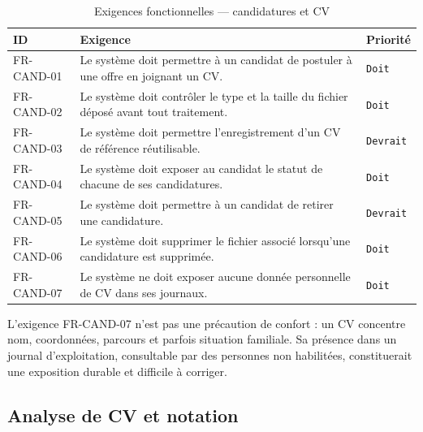\begin{table}[htbp]
  \centering
  \caption{Exigences fonctionnelles — candidatures et CV}
  \label{tab:fr_applications}
  \begin{tabularx}{\textwidth}{L{2.4cm} X L{1.9cm}}
    \toprule
    \textbf{ID} & \textbf{Exigence} & \textbf{Priorité} \\
    \midrule
    FR-CAND-01 & Le système doit permettre à un candidat de postuler à une offre en joignant un CV. & \texttt{Doit} \\
    FR-CAND-02 & Le système doit contrôler le type et la taille du fichier déposé avant tout traitement. & \texttt{Doit} \\
    FR-CAND-03 & Le système doit permettre l'enregistrement d'un CV de référence réutilisable. & \texttt{Devrait} \\
    FR-CAND-04 & Le système doit exposer au candidat le statut de chacune de ses candidatures. & \texttt{Doit} \\
    FR-CAND-05 & Le système doit permettre à un candidat de retirer une candidature. & \texttt{Devrait} \\
    FR-CAND-06 & Le système doit supprimer le fichier associé lorsqu'une candidature est supprimée. & \texttt{Doit} \\
    FR-CAND-07 & Le système ne doit exposer aucune donnée personnelle de CV dans ses journaux. & \texttt{Doit} \\
    \bottomrule
  \end{tabularx}
\end{table}

L'exigence FR-CAND-07 n'est pas une précaution de confort : un CV concentre
nom, coordonnées, parcours et parfois situation familiale. Sa présence dans un
journal d'exploitation, consultable par des personnes non habilitées,
constituerait une exposition durable et difficile à corriger.

\subsection{Analyse de CV et notation}
\label{sec:fr_scoring}

